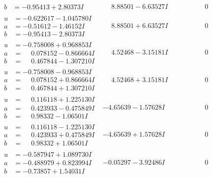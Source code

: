\documentclass[1p]{elsarticle_modified}
\theoremstyle{definition}
\begin{document}
$$\begin{array}{c|c|c}
\begin{aligned}
b &= -0.95413 + 2.80373 I\end{aligned}
 & \phantom{-}8.88501 - 6.63527 I & \phantom{-0.000000 } 0 \\ \hline\begin{aligned}
u &= -0.622617 - 1.045780 I \\
a &= -0.51612 - 1.46152 I \\
b &= -0.95413 - 2.80373 I\end{aligned}
 & \phantom{-}8.88501 + 6.63527 I & \phantom{-0.000000 } 0 \\ \hline\begin{aligned}
u &= -0.758008 + 0.968853 I \\
a &= \phantom{-}0.078152 - 0.866664 I \\
b &= \phantom{-}0.467844 - 1.307210 I\end{aligned}
 & \phantom{-}4.52468 - 3.15181 I & \phantom{-0.000000 } 0 \\ \hline\begin{aligned}
u &= -0.758008 - 0.968853 I \\
a &= \phantom{-}0.078152 + 0.866664 I \\
b &= \phantom{-}0.467844 + 1.307210 I\end{aligned}
 & \phantom{-}4.52468 + 3.15181 I & \phantom{-0.000000 } 0 \\ \hline\begin{aligned}
u &= \phantom{-}0.116118 + 1.225130 I \\
a &= \phantom{-}0.423933 - 0.475849 I \\
b &= \phantom{-}0.98332 - 1.06501 I\end{aligned}
 & -4.65639 - 1.57628 I & \phantom{-0.000000 } 0 \\ \hline\begin{aligned}
u &= \phantom{-}0.116118 - 1.225130 I \\
a &= \phantom{-}0.423933 + 0.475849 I \\
b &= \phantom{-}0.98332 + 1.06501 I\end{aligned}
 & -4.65639 + 1.57628 I & \phantom{-0.000000 } 0 \\ \hline\begin{aligned}
u &= -0.587947 + 1.089730 I \\
a &= -0.488979 + 0.823994 I \\
b &= -0.73857 + 1.54031 I\end{aligned}
 & -0.05297 - 3.92486 I & \phantom{-0.000000 } 0 \\ \hline\begin{aligned}

\end{aligned}
\end{array}$$
\end{document}

